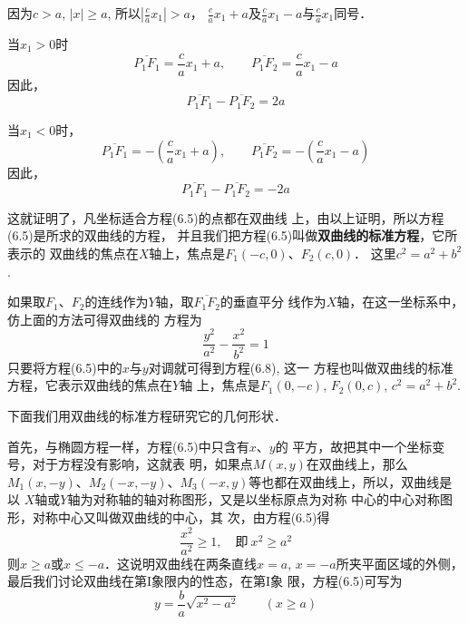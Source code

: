 因为$c>a$, $|x|\ge a$, 所以$\left|\frac{c}{a}x_1\right|>a$，
$\frac{c}{a}x_1+a$及$\frac{c}{a}x_1-a$与$\frac{c}{a}x_1$同号．

当$x_1>0$时
\[\overline{P_1F_1}=\frac{c}{a}x_1+a,\qquad \overline{P_1F_2}=\frac{c}{a}x_1-a\]
因此，
\[\overline{P_1F_1}-\overline{P_1F_2}=2a\]

当$x_1<0$时，
\[\overline{P_1F_1}=-\left(\frac{c}{a}x_1+a\right),\qquad \overline{P_1F_2}=-\left(\frac{c}{a}x_1-a\right)\]
因此，
\[\overline{P_1F_1}-\overline{P_1F_2}=-2a\]

这就证明了，凡坐标适合方程(6.5)的点都在双曲线
上，由以上证明，所以方程(6.5)是所求的双曲线的方程，
并且我们把方程(6.5)叫做\textbf{双曲线的标准方程}，它所表示的
双曲线的焦点在$X$轴上，焦点是$F_1(-c,0)$、$F_2(c,0)$．
这里$c^2=a^2+b^2$.

如果取$F_1$、$F_2$的连线作为$Y$轴，取$\overline{F_1F_2}$的垂直平分
线作为$X$轴，在这一坐标系中，仿上面的方法可得双曲线的
方程为
\begin{equation}
    \boxed{\frac{y^2}{a^2}-\frac{x^2}{b^2}=1}
\end{equation}
只要将方程(6.5)中的$x$与$y$对调就可得到方程(6.8), 这一
方程也叫做双曲线的标准方程，它表示双曲线的焦点在$Y$轴
上，焦点是$F_1(0,-c)$, $F_2(0,c)$, $c^2=a^2+b^2$.

下面我们用双曲线的标准方程研究它的几何形状．

首先，与椭圆方程一样，方程(6.5)中只含有$x$、$y$的
平方，故把其中一个坐标变号，对于方程没有影响，这就表
明，如果点$M(x,y)$在双曲线上，那么$M_1(x,-y)$、$M_2(-x,
-y)$、$M_3(-x,y)$等也都在双曲线上，所以，双曲线是以
$X$轴或$Y$轴为对称轴的轴对称图形，又是以坐标原点为对称
中心的中心对称图形，对称中心又叫做双曲线的中心，其
次，由方程(6.5)得
\[\frac{x^2}{a^2}\ge 1,\quad\text{即}\ x^2\ge a^2\]
则$x\ge a$或$x\le -a$．这说明双曲线在两条直线$x=a$, $x=-a$所夹平面区域的外侧，最后我们讨论双曲线在第I象限内的性态，在第I象
限，方程(6.5)可写为
\[y=\frac{b}{a}\sqrt{x^2-a^2}\qquad (x\ge a)\]

\begin{figure}[htp]
    \centering
{}
    \caption{}
\end{figure}

